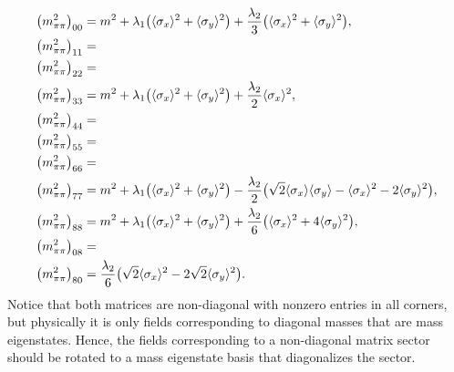 \begin{equation}
\begin{split}
	\big(m^2_{\pi\pi}\big)_{00} &= m^2 + \lambda_1 \big(\avg{\sigma_x}^2 + \avg{\sigma_y}^2\big) + \frac{\lambda_2}{3} \big(\avg{\sigma_x}^2 + \avg{\sigma_y}^2\big), \\
	\big(m^2_{\pi\pi}\big)_{11} &= \\
	\big(m^2_{\pi\pi}\big)_{22} &= \\
	\big(m^2_{\pi\pi}\big)_{33} &= m^2 + \lambda_1 \big(\avg{\sigma_x}^2 + \avg{\sigma_y}^2\big) + \frac{\lambda_2}{2} \avg{\sigma_x}^2, \\
	\big(m^2_{\pi\pi}\big)_{44} &= \\
	\big(m^2_{\pi\pi}\big)_{55} &= \\
	\big(m^2_{\pi\pi}\big)_{66} &= \\
	\big(m^2_{\pi\pi}\big)_{77} &= m^2 + \lambda_1 \big(\avg{\sigma_x}^2 + \avg{\sigma_y}^2\big) - \frac{\lambda_2}{2} \big(\sqrt{2} \avg{\sigma_x} \avg{\sigma_y} - \avg{\sigma_x}^2 - 2 \avg{\sigma_y}^2\big), \\
	\big(m^2_{\pi\pi}\big)_{88} &= m^2 + \lambda_1 \big(\avg{\sigma_x}^2 + \avg{\sigma_y}^2\big) + \frac{\lambda_2}{6} \big(\avg{\sigma_x}^2 + 4 \avg{\sigma_y}^2\big), \\ 
	\big(m^2_{\pi\pi}\big)_{08} &= \\
	\big(m^2_{\pi\pi}\big)_{80} &= \frac{\lambda_2}{6} \big(\sqrt{2} \avg{\sigma_x}^2 - 2 \sqrt{2} \avg{\sigma_y}^2\big).
\end{split}%
\label{eq:lsm3f:mass_pi_pi}
\end{equation}%
Notice that both matrices are non-diagonal with nonzero entries in all corners,
but physically it is only fields corresponding to diagonal masses that are mass eigenstates. \cite{ref:lsm3f_details}
Hence, the fields corresponding to a non-diagonal matrix sector should be rotated to a mass eigenstate basis that diagonalizes the sector.
